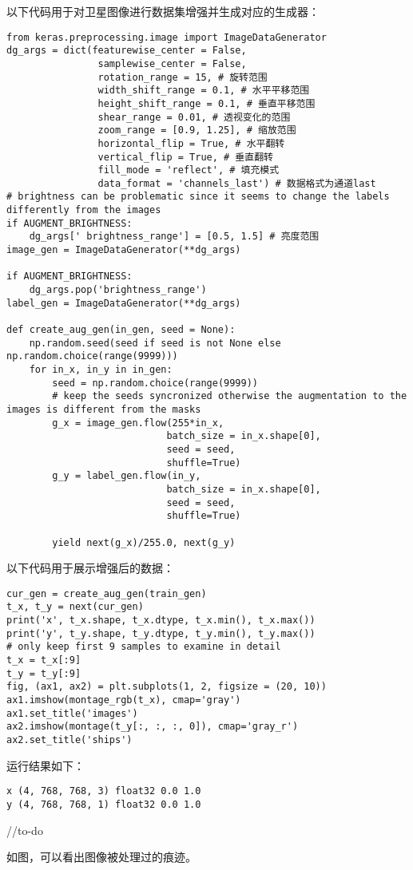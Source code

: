 以下代码用于对卫星图像进行数据集增强并生成对应的生成器：

\begin{verbatim}
from keras.preprocessing.image import ImageDataGenerator
dg_args = dict(featurewise_center = False, 
                samplewise_center = False,
                rotation_range = 15, # 旋转范围
                width_shift_range = 0.1, # 水平平移范围
                height_shift_range = 0.1, # 垂直平移范围
                shear_range = 0.01, # 透视变化的范围
                zoom_range = [0.9, 1.25], # 缩放范围
                horizontal_flip = True, # 水平翻转
                vertical_flip = True, # 垂直翻转
                fill_mode = 'reflect', # 填充模式
                data_format = 'channels_last') # 数据格式为通道last
# brightness can be problematic since it seems to change the labels differently from the images 
if AUGMENT_BRIGHTNESS:
    dg_args[' brightness_range'] = [0.5, 1.5] # 亮度范围
image_gen = ImageDataGenerator(**dg_args)

if AUGMENT_BRIGHTNESS:
    dg_args.pop('brightness_range')
label_gen = ImageDataGenerator(**dg_args)

def create_aug_gen(in_gen, seed = None):
    np.random.seed(seed if seed is not None else np.random.choice(range(9999)))
    for in_x, in_y in in_gen:
        seed = np.random.choice(range(9999))
        # keep the seeds syncronized otherwise the augmentation to the images is different from the masks
        g_x = image_gen.flow(255*in_x, 
                            batch_size = in_x.shape[0], 
                            seed = seed, 
                            shuffle=True)
        g_y = label_gen.flow(in_y, 
                            batch_size = in_x.shape[0], 
                            seed = seed, 
                            shuffle=True)

        yield next(g_x)/255.0, next(g_y)
\end{verbatim}

以下代码用于展示增强后的数据：

\begin{verbatim}
cur_gen = create_aug_gen(train_gen)
t_x, t_y = next(cur_gen)
print('x', t_x.shape, t_x.dtype, t_x.min(), t_x.max())
print('y', t_y.shape, t_y.dtype, t_y.min(), t_y.max())
# only keep first 9 samples to examine in detail
t_x = t_x[:9]
t_y = t_y[:9]
fig, (ax1, ax2) = plt.subplots(1, 2, figsize = (20, 10))
ax1.imshow(montage_rgb(t_x), cmap='gray')
ax1.set_title('images')
ax2.imshow(montage(t_y[:, :, :, 0]), cmap='gray_r')
ax2.set_title('ships')
\end{verbatim}

运行结果如下：

\begin{verbatim}
x (4, 768, 768, 3) float32 0.0 1.0
y (4, 768, 768, 1) float32 0.0 1.0
\end{verbatim}

//to-do

如图，可以看出图像被处理过的痕迹。
